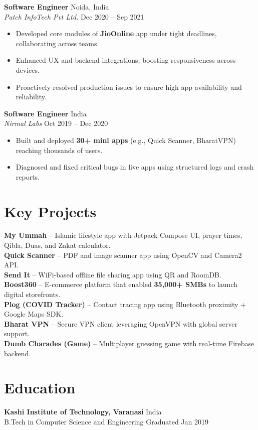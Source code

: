 \documentclass[a4paper,10pt]{article}
\begin{document}
\textbf{Software Engineer} \hfill Noida, India \\
\textit{Patch InfoTech Pvt Ltd.} \hfill \textcolor{secondary}{Dec 2020 -- Sep 2021}
\begin{itemize}[left=0pt, label=\textbullet, itemsep=4pt]
    \item Developed core modules of \textbf{JioOnline} app under tight deadlines, collaborating across teams.
    \item Enhanced UX and backend integrations, boosting responsiveness across devices.
    \item Proactively resolved production issues to ensure high app availability and reliability.
\end{itemize}

\textbf{Software Engineer} \hfill India \\
\textit{Nirmal Labs} \hfill \textcolor{secondary}{Oct 2019 -- Dec 2020}
\begin{itemize}[left=0pt, label=\textbullet, itemsep=4pt]
    \item Built and deployed \textbf{30+ mini apps} (e.g., Quick Scanner, BharatVPN) reaching thousands of users.
    \item Diagnosed and fixed critical bugs in live apps using structured logs and crash reports.
\end{itemize}


\section*{Key Projects}
\textbf{My Ummah} – Islamic lifestyle app with Jetpack Compose UI, prayer times, Qibla, Duas, and Zakat calculator. \\
\textbf{Quick Scanner} – PDF and image scanner app using OpenCV and Camera2 API. \\
\textbf{Send It} – WiFi-based offline file sharing app using QR and RoomDB. \\
\textbf{Boost360} – E-commerce platform that enabled \textbf{35,000+ SMBs} to launch digital storefronts. \\
\textbf{Plog (COVID Tracker)} – Contact tracing app using Bluetooth proximity + Google Maps SDK. \\
\textbf{Bharat VPN} – Secure VPN client leveraging OpenVPN with global server support. \\
\textbf{Dumb Charades (Game)} – Multiplayer guessing game with real-time Firebase backend.

\section*{Education}
\textbf{Kashi Institute of Technology, Varanasi} \hfill India \\
B.Tech in Computer Science and Engineering \hfill \textcolor{secondary}{Graduated Jan 2019}
\end{document}
